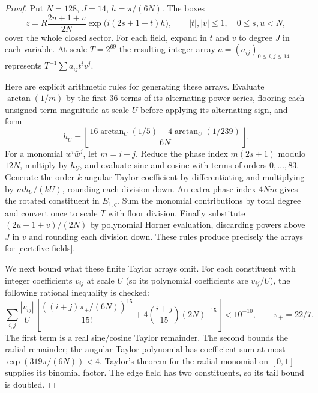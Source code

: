 \documentclass[11pt]{article}
\numberwithin{equation}{section}
\theoremstyle{definition}
\theoremstyle{remark}
\begin{document}
\begin{proof}
Put $N=128$, $J=14$, $h=\pi/(6N)$.  The boxes
\begin{equation}\label{cert:polar-box}
 z=R\frac{2u+1+v}{2N}\exp\bigl(i(2s+1+t)h\bigr),\qquad
 |t|,|v|\leq1,\quad 0\leq s,u<N,
\end{equation}
cover the whole closed sector.  For each field, expand in $t$ and $v$ to
degree $J$ in each variable.  At scale $T=2^{69}$ the resulting integer
array $a=(a_{ij})_{0\leq i,j\leq14}$ represents
$T^{-1}\sum a_{ij}t^iv^j$.

Here are explicit arithmetic rules for generating these arrays.  Evaluate
$\arctan(1/m)$ by the first 36 terms of its alternating power series,
flooring each unsigned term magnitude at scale $U$ before applying its
alternating sign, and form
\[
 h_U=\left\lfloor\frac{16\arctan_U(1/5)-4\arctan_U(1/239)}{6N}\right\rfloor.
\]
For a monomial $w^i\bar w^j$, let $m=i-j$.  Reduce the phase index
$m(2s+1)$ modulo $12N$, multiply by $h_U$, and evaluate sine and cosine
with terms of orders $0,\ldots,83$.  Generate the order-$k$ angular Taylor
coefficient by differentiating and multiplying by $mh_U/(kU)$, rounding
each division down.  An extra phase index $4Nm$ gives the rotated
constituent in $E_{1,q}$.  Sum the monomial contributions by total degree
and convert once to scale $T$ with floor division.  Finally substitute
$(2u+1+v)/(2N)$ by polynomial Horner evaluation, discarding powers above
$J$ in $v$ and rounding each division down.  These rules produce precisely
the arrays for \eqref{cert:five-fields}.

We next bound what these finite Taylor arrays omit.  For each constituent with integer coefficients $v_{ij}$ at scale $U$
(so its polynomial coefficients are $v_{ij}/U$), the following rational
inequality is checked:
\begin{equation}\label{cert:taylor-tail}
 \sum_{i,j}\frac{|v_{ij}|}{U}\left[
  \frac{((i+j)\pi_+/(6N))^{15}}{15!}
       +4\binom{i+j}{15}(2N)^{-15}\right]<10^{-10},
 \qquad \pi_+=22/7.
\end{equation}
The first term is a real sine/cosine Taylor remainder.  The second bounds
the radial remainder; the angular Taylor polynomial has coefficient sum
at most $\exp(319\pi/(6N))<4$.  Taylor's theorem for the radial monomial
on $[0,1]$ supplies its binomial factor.  The edge field has two
constituents, so its tail bound is doubled.


\end{proof}
\end{document}

